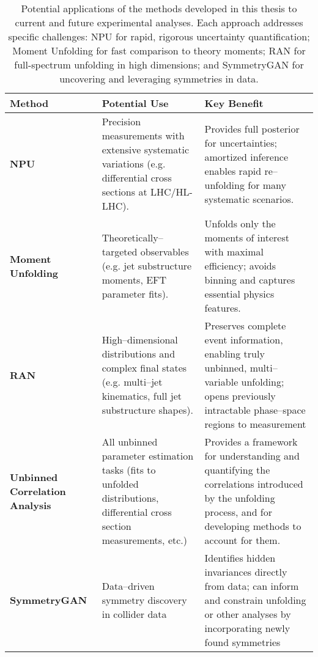         \begin{table}
            \centering
            \begin{tabular}{p{3.5cm} p{5.8cm} p{6.5cm}}
                \textbf{Method} & \textbf{Potential Use} & \textbf{Key Benefit} \\
                \hline
                \textbf{NPU}
                & Precision measurements with extensive systematic variations (e.g. differential cross sections at LHC/HL-LHC).
                & Provides full posterior for uncertainties; amortized inference enables rapid re--unfolding for many systematic scenarios. \\
                \textbf{Moment Unfolding}
                & Theoretically--targeted observables (e.g. jet substructure moments, EFT parameter fits).
                & Unfolds only the moments of interest with maximal efficiency; avoids binning and captures essential physics features. \\
                \textbf{RAN}
                & High--dimensional distributions and complex final states (e.g. multi--jet kinematics, full jet substructure shapes).
                & Preserves complete event information, enabling truly unbinned, multi--variable unfolding; opens previously intractable phase--space regions to measurement \\
                \textbf{Unbinned Correlation Analysis}
                & All unbinned parameter estimation tasks (fits to unfolded distributions, differential cross section measurements, etc.)
                & Provides a framework for understanding and quantifying the correlations introduced by the unfolding process, and for developing methods to account for them. \\
                \textbf{SymmetryGAN}
                & Data--driven symmetry discovery in collider data
                & Identifies hidden invariances directly from data; can inform and constrain unfolding or other analyses by incorporating newly found symmetries\\
            \end{tabular}
            \caption[Applications of methods to experimental scenarios]{
                Potential applications of the methods developed in this thesis to current and future experimental analyses. Each approach addresses specific challenges: NPU for rapid, rigorous uncertainty quantification; Moment Unfolding for fast comparison to theory moments; RAN for full-spectrum unfolding in high dimensions; and SymmetryGAN for uncovering and leveraging symmetries in data.
            }
            \label{tab:method_applications}
        \end{table}

